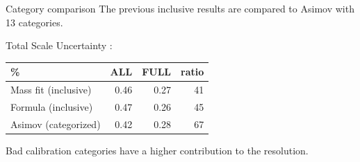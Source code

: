 \documentclass[a4paper]{beamer}
\begin{document}
  \begin{frame}{Category comparison}
    The previous inclusive results are compared to Asimov with 13 categories.

    \begin{center}
      Total Scale Uncertainty :\\
      \begin{tabular}{l|rrr}
        \% & ALL & FULL & ratio\\
        \hline
        Mass fit (inclusive) & 0.46 & 0.27 & 41\\
        Formula (inclusive) & 0.47 & 0.26 & 45\\
        Asimov (categorized) & 0.42 & 0.28 & 67\\
      \end{tabular}
    \end{center}

    Bad calibration categories have a higher contribution to the resolution.
  \end{frame}
\end{document}

